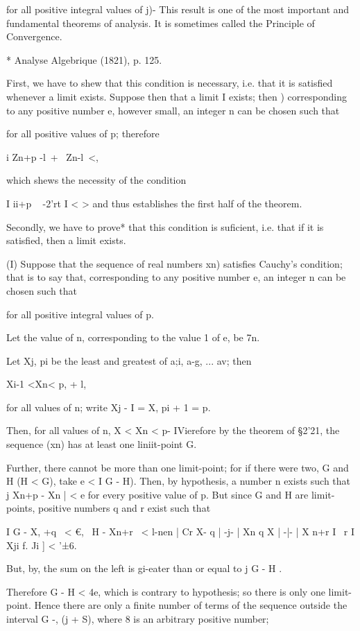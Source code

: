 for all positive integral values of j)- This result is one of the most
important and fundamental theorems of analysis. It is sometimes called
the Principle of Convergence.

* Analyse Algebrique (1821), p. 125.

%
%

First, we have to shew that this condition is necessary, i.e. that it
is satisfied whenever a limit exists. Suppose then that a limit I
exists; then ) corresponding to any positive number e, however
small, an integer n can be chosen such that

for all positive values of p; therefore

  i Zn+p -l\ + \ Zn-l\ <,

which shews the necessity of the condition

I ii+p ~ -2'rt I < > and thus establishes the first half of the
theorem.

Secondly, we have to prove* that this condition is suficient, i.e.
that if it is satisfied, then a limit exists.

(I) Suppose that the sequence of real numbers xn) satisfies Cauchy's
condition; that is to say that, corresponding to any positive number
e, an integer n can be chosen such that

for all positive integral values of p.

Let the value of n, corresponding to the value 1 of e, be 7n.

Let Xj, pi be the least and greatest of a;i, a-g, ... av; then

Xi-1 <Xn< p, + l,

for all values of n; write Xj - I = X, pi + 1 = p.

Then, for all values of n, X < Xn < p- IVierefore by the theorem of
§2'21, the sequence (xn) has at least one liniit-point G.

Further, there cannot be more than one limit-point; for if there were
two, G and H (H < G), take e < I G - H). Then, by hypothesis, a number
n exists such that j Xn+p - Xn | < e for every positive value of p.
But since G and H are limit-points, positive numbers q and r exist
such that

I G - X, +q \ < €, \ H - Xn+r \ < l-nen | Cr X- q | -j- | Xn q X | -|-
| X n+r I ~r I Xji f. Ji ] < '±6.

But, by, the sum on the left is gi-eater than or equal to j G -
H .

Therefore G - H < 4e, which is contrary to hypothesis; so there is
only one limit- point. Hence there are only a finite number of terms
of the sequence outside the interval G -, (j + S), where 8 is an
arbitrary positive number;

